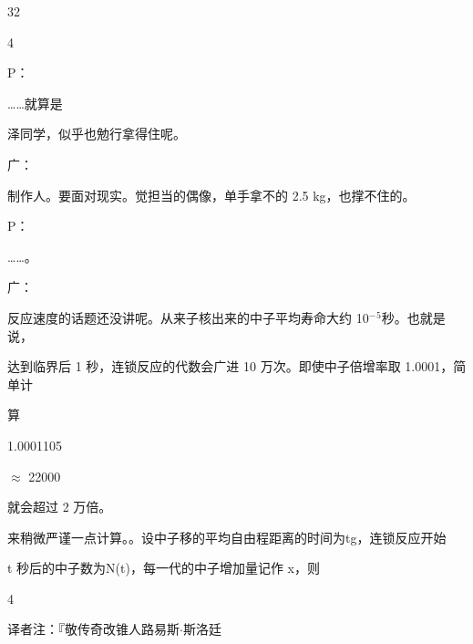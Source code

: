 32\par
4\par
P：\par
……就算是\par
泽同学，似乎也勉行拿得住呢。\par
广：\par
制作人。要面对现实。觉担当的偶像，单手拿不的 2.5 kg，也撑不住的。\par
P：\par
……。\par
广：\par
反应速度的话题还没讲呢。从来子核出来的中子平均寿命大约 10$^{-}$$^{5}$秒。也就是说，\par
达到临界后 1 秒，连锁反应的代数会广进 10 万次。即使中子倍增率取 1.0001，简单计\par
算\par
1.0001105\par
$\approx$ 22000\par
就会超过 2 万倍。\par
来稍微严谨一点计算。。设中子移的平均自由程距离的时间为tg，连锁反应开始\par
t 秒后的中子数为N(t)，每一代的中子增加量记作 x，则\par
4\par
译者注：『敬传奇改锥人路易斯$\cdot$斯洛廷\par

